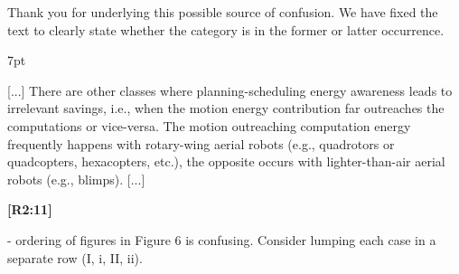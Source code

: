 \documentclass[10pt]{letter}
\newenvironment{formal}{%
  \def\FrameCommand{%
    \hspace{1pt}%
    {\color{red}\vrule width 2pt}%
    {\color{formalshade}\vrule width 4pt}%
    \colorbox{formalshade}%
  }%
  \MakeFramed{\advance\hsize-\width\FrameRestore}%
  \noindent\hspace{-4.55pt}%
  \begin{adjustwidth}{}{7pt}%
  \vspace{2pt}\vspace{2pt}%
}
{%
  \vspace{2pt}\end{adjustwidth}\endMakeFramed%
}
\begin{document}
{\color{blue} 

{\hspace*{-4.5em}{[R2:10]}\vspace*{-1.9em}}

Thank you for underlying this possible source of confusion. We have fixed the text to clearly state whether the category is in the former or latter occurrence.

\begin{formal}
  \color{black} [...] There are other classes where planning-scheduling energy awareness leads to irrelevant savings, i.e., when the motion energy contribution far outreaches the computations or vice-versa. The {\color{blue}motion outreaching computation energy} frequently happens with rotary-wing aerial robots (e.g., quadrotors or quadcopters, hexacopters, etc.){\color{blue}, the opposite occurs with} lighter-than-air aerial robots (e.g., blimps). [...]
  \vspace*{1ex}
\end{formal}}

{\hspace*{-4.5em}\textbf{[R2:11]}\vspace*{-1.9em}}

- ordering of figures in Figure 6 is confusing. Consider lumping each case in a separate row (I, i, II, ii). 
  
\end{document}
